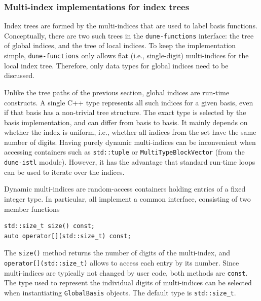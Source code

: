 \documentclass[a4paper,10pt,headings=normal,bibliography=totoc]{scrartcl}
\newcommand{\cpp}[1]{\lstinline[basicstyle=\ttfamily]!#1!}
\newcommand{\dunemodule}[1]{\texttt{#1}}
\begin{document}
\subsubsection{Multi-index implementations for index trees}
\label{sec:multi_indicies_for_index_trees}

Index trees are formed by the multi-indices that are used to label basis functions.
Conceptually, there are two such trees in the \dunemodule{dune-functions} interface:
the tree of global indices, and the tree of local indices.  To keep the implementation simple,
\dunemodule{dune-functions} only allows flat (i.e., single-digit) multi-indices for the local index tree.
Therefore, only data types for global indices need to be discussed.

Unlike the tree paths of the previous section,
global indices are run-time constructs.  A single C++ type represents all such
indices for a given basis, even if that basis has a non-trivial tree structure.
The exact type is selected by the basis implementation, and can differ from basis to basis.
It mainly depends on whether the index is uniform, i.e., whether all indices from the
set have the same number of digits.
Having purely dynamic multi-indices can be inconvenient when accessing
containers such as \cpp{std::tuple}
or \cpp{MultiTypeBlockVector} (from the \dunemodule{dune-istl}
module). However, it has the advantage that standard run-time loops can be used
to iterate over the indices.

Dynamic multi-indices are random-access containers holding entries of a fixed integer type.
In particular, all implement a common interface, consisting of two member functions
%
\begin{lstlisting}[style=Interface]
std::size_t size() const;
auto operator[](std::size_t) const;
\end{lstlisting}
%
The \cpp{size()} method returns the number of digits of the multi-index,
and \cpp{operator[](std::size_t)} allows to access
each entry by its number. Since multi-indices are
typically not changed by user code, both methods are \cpp{const}.
The type used to represent
the individual digits of multi-indices can be selected when instantiating \cpp{GlobalBasis}
objects.  The default type is \cpp{std::size_t}.
\end{document}
